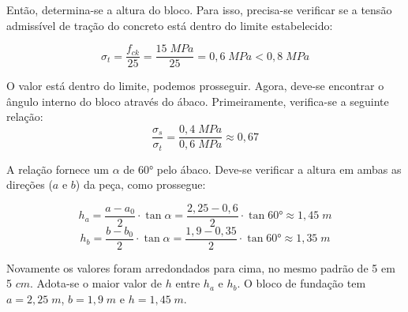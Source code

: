 Então, determina-se a altura do bloco. Para isso, precisa-se verificar se a tensão admissível de tração do concreto está dentro do limite estabelecido:

$$\sigma_t=\frac{f_{ck}}{25}=\frac{15\;MPa}{25}=0,6\;MPa < 0,8\;MPa$$

O valor está dentro do limite, podemos prosseguir. Agora, deve-se encontrar o ângulo interno do bloco através do ábaco. Primeiramente, verifica-se a seguinte relação: $$\frac{\sigma_s}{\sigma_t}=\frac{0,4\;MPa}{0,6\;MPa}\approx 0,67$$

A relação fornece um $\alpha$ de $\ang{60}$ pelo ábaco. Deve-se verificar a altura em ambas as direções ($a$ e $b$) da peça, como prossegue:

$$h_a=\frac{a-a_0}{2}\cdot \tan{\alpha}=\frac{2,25-0,6}{2}\cdot \tan{\ang{60}}\approx 1,45\;m$$
$$h_b=\frac{b-b_0}{2}\cdot \tan{\alpha}=\frac{1,9-0,35}{2}\cdot \tan{\ang{60}}\approx 1,35\;m$$

Novamente os valores foram arredondados para cima, no mesmo padrão de 5 em 5 $cm$. Adota-se o maior valor de $h$ entre $h_a$ e $h_b$. O bloco de fundação tem $a=2,25\;m$, $b=1,9\;m$ e $h=1,45\;m$.


